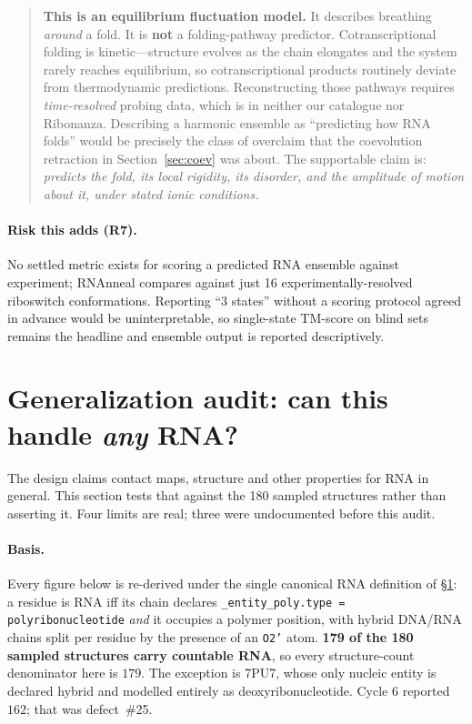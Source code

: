 \documentclass[11pt,a4paper]{article}
\begin{document}
\begin{quote}
\textcolor{risk}{\textbf{This is an equilibrium fluctuation model.}} It describes
breathing \emph{around} a fold. It is \textbf{not} a folding-pathway predictor.
Cotranscriptional folding is kinetic---structure evolves as the chain elongates
and the system rarely reaches equilibrium, so cotranscriptional products
routinely deviate from thermodynamic predictions. Reconstructing those pathways
requires \emph{time-resolved} probing data, which is in neither our catalogue nor
Ribonanza. Describing a harmonic ensemble as ``predicting how RNA folds'' would
be precisely the class of overclaim that the coevolution retraction in
Section~\ref{sec:coev} was about. The supportable claim is: \emph{predicts the
fold, its local rigidity, its disorder, and the amplitude of motion about it,
under stated ionic conditions.}
\end{quote}

\paragraph{Risk this adds (R7).} No settled metric exists for scoring a predicted
RNA ensemble against experiment; RNAnneal compares against just 16
experimentally-resolved riboswitch conformations. Reporting ``3 states'' without
a scoring protocol agreed in advance would be uninterpretable, so single-state
TM-score on blind sets remains the headline and ensemble output is reported
descriptively.

\section{Generalization audit: can this handle \emph{any} RNA?}
\label{sec:gen}

The design claims contact maps, structure and other properties for RNA in
general. This section tests that against the 180 sampled structures rather than
asserting it. Four limits are real; three were undocumented before this audit.

\paragraph{Basis.} Every figure below is re-derived under the single canonical
RNA definition of \S\ref{sec:gen}: a residue is RNA iff its chain declares
\texttt{\_entity\_poly.type = polyribonucleotide} \emph{and} it occupies a
polymer position, with hybrid DNA/RNA chains split per residue by the presence of
an \texttt{O2'} atom. \textbf{179 of the 180 sampled structures carry countable
RNA}, so every structure-count denominator here is $179$. The exception is 7PU7,
whose only nucleic entity is declared hybrid and modelled entirely as
deoxyribonucleotide. Cycle 6 reported $162$; that was defect~\#25.
\end{document}

